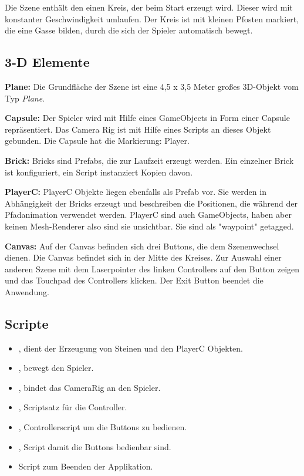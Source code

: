 Die Szene enthält den einen Kreis, der beim Start erzeugt wird. Dieser wird mit konstanter Geschwindigkeit umlaufen. Der Kreis ist mit kleinen Pfosten markiert, die eine Gasse bilden, durch die sich der Spieler automatisch bewegt.



\subsection{3-D Elemente}

\textbf{Plane: } Die Grundfläche der Szene ist eine 4,5 x 3,5 Meter großes 3D-Objekt vom Typ \emph{Plane}.

\textbf{Capsule: } Der Spieler wird mit Hilfe eines GameObjects in Form einer Capsule repräsentiert. Das Camera Rig ist mit Hilfe eines Scripts an dieses Objekt gebunden. Die Capsule hat die Markierung: Player.

\textbf{Brick: } Bricks sind Prefabs, die zur Laufzeit erzeugt werden. Ein einzelner Brick ist konfiguriert, ein Script instanziert Kopien davon.

\textbf{PlayerC: } PlayerC Objekte liegen ebenfalls als Prefab vor. Sie werden in Abhängigkeit der Bricks erzeugt und beschreiben die Positionen, die während der Pfadanimation verwendet werden. PlayerC sind auch GameObjects, haben aber keinen Mesh-Renderer also sind sie unsichtbar. Sie sind als "waypoint" getagged.

\textbf{Canvas: } Auf der Canvas befinden sich drei Buttons, die dem Szenenwechsel dienen. Die Canvas befindet sich in der Mitte des Kreises. Zur Auswahl einer anderen Szene mit dem Laserpointer des linken Controllers auf den Button zeigen und das Touchpad des Controllers klicken. Der Exit Button beendet die Anwendung.


\subsection{Scripte}
\label{Circle_Scripts}
\begin{itemize}
	\item {}, dient der Erzeugung von Steinen und den PlayerC Objekten.
	\item {}, bewegt den Spieler.
	\item {}, bindet das CameraRig an den Spieler.
	\item {}, Scriptsatz für die Controller.
	\item {}, Controllerscript um die Buttons zu bedienen.
	\item {}, Script damit die Buttons bedienbar sind.
	\item {} Script zum Beenden der Applikation.
\end{itemize}


